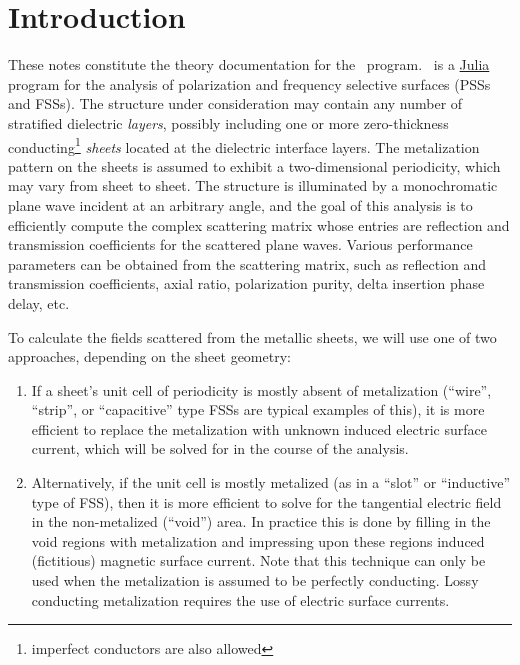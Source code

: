 \documentclass[
letterpaper, %
11pt, %
oneside, 
onecolumn, %
openany, %
]{memoir}
\numberwithin{equation}{chapter}
\numberwithin{figure}{chapter}
\begin{document}

\clearpage

\tableofcontents*
\clearpage


\chapter{Introduction}
These notes constitute the theory documentation for the \pssfss\
program.  \pssfss\ is a \href{https://julialang.org/}{Julia} \cite{bezanson2017julia} program for the analysis
of polarization and frequency selective surfaces (PSSs and FSSs). The
structure under consideration may contain any number of 
stratified dielectric \emph{layers}, possibly including one or more
zero-thickness conducting\footnote{imperfect conductors 
are also allowed} \emph{sheets} located at the dielectric interface
layers.  The metalization pattern on the sheets is 
assumed to exhibit a two-dimensional periodicity, which may vary from
sheet to sheet.  The structure is illuminated by 
a monochromatic plane wave incident at an arbitrary angle, and the
goal of this analysis is to efficiently compute the complex scattering
matrix whose entries are reflection and transmission coefficients for
the scattered plane waves.  Various performance parameters can be obtained
from the scattering matrix, such as reflection and transmission
coefficients, axial ratio, polarization purity, delta insertion phase
delay, etc.  

To calculate the fields scattered from the metallic sheets, we will
use one of two approaches, depending on the sheet geometry:
\begin{enumerate}
\item If a sheet's unit cell of periodicity is mostly absent of
  metalization (``wire'', ``strip'', or ``capacitive'' type FSSs are
  typical examples of this), 
  it is more efficient to replace the metalization
  with unknown induced electric surface current, which will be
  solved for in the course of the analysis.
\item Alternatively, if the unit cell is mostly metalized (as in a
  ``slot'' or ``inductive'' type of FSS), then it is
  more efficient to solve for the tangential electric field in the
  non-metalized (``void'') area.  In practice this is done by filling
  in the void regions 
  with metalization and impressing upon these regions induced
  (fictitious) magnetic surface current.  Note that this technique can
  only be used when the metalization is assumed to be perfectly
  conducting.  Lossy conducting metalization requires the use of
  electric surface currents.
\end{enumerate}
\end{document}
